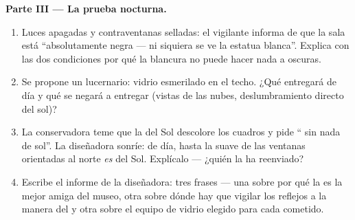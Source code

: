 \begin{problem}
\medskip\noindent\textbf{Parte III --- La prueba nocturna.}
\begin{enumerate}[resume]
  \item Luces apagadas y contraventanas selladas: el vigilante
        informa de que la sala está ``absolutamente negra --- ni
        siquiera se ve la estatua blanca''. Explica con las dos
        condiciones por qué la blancura no puede hacer nada a
        oscuras.
  \item Se propone un lucernario: vidrio esmerilado en el techo. ¿Qué
        entregará de día y qué se negará a entregar (vistas de las
        nubes, deslumbramiento directo del sol)?
  \item La conservadora teme que la  del Sol descolore los cuadros
        y pide `` sin nada de sol''. La diseñadora sonríe: de
        día, hasta la  suave de las ventanas orientadas al norte
        \emph{es}  del Sol. Explícalo --- ¿quién la ha reenviado?
  \item Escribe el informe de la diseñadora: tres frases --- una
        sobre por qué la  es la mejor amiga del museo, otra
        sobre dónde hay que vigilar los reflejos a la manera del
         y otra sobre el equipo de vidrio elegido para cada
        cometido.
\end{enumerate}
\end{problem}
